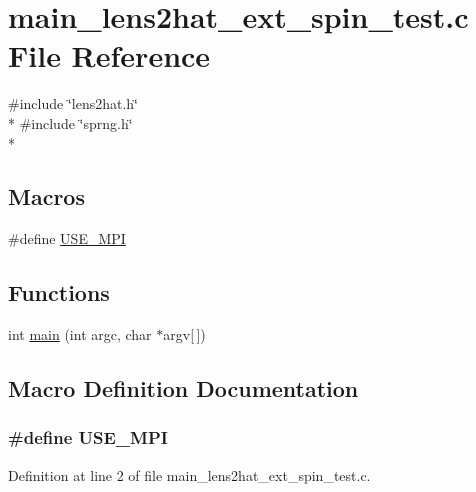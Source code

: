\section{main\-\_\-lens2hat\-\_\-ext\-\_\-spin\-\_\-test.\-c File Reference}
\label{main__lens2hat__ext__spin__test_8c}
{\ttfamily \#include \char`\"{}lens2hat.\-h\char`\"{}}\\*
{\ttfamily \#include \char`\"{}sprng.\-h\char`\"{}}\\*
\subsection*{Macros}
\begin{DoxyCompactItemize}
\item 
\#define \hyperlink{main__lens2hat__ext__spin__test_8c_a3869d282031f6ea6b50fdb980b758420}{U\-S\-E\-\_\-\-M\-P\-I}
\end{DoxyCompactItemize}
\subsection*{Functions}
\begin{DoxyCompactItemize}
\item 
int \hyperlink{main__lens2hat__ext__spin__test_8c_a0ddf1224851353fc92bfbff6f499fa97}{main} (int argc, char $\ast$argv\mbox{[}$\,$\mbox{]})
\end{DoxyCompactItemize}


\subsection{Macro Definition Documentation}
\subsubsection[{U\-S\-E\-\_\-\-M\-P\-I}]{\setlength{\rightskip}{0pt plus 5cm}\#define U\-S\-E\-\_\-\-M\-P\-I}\label{main__lens2hat__ext__spin__test_8c_a3869d282031f6ea6b50fdb980b758420}


Definition at line 2 of file main\-\_\-lens2hat\-\_\-ext\-\_\-spin\-\_\-test.\-c.



